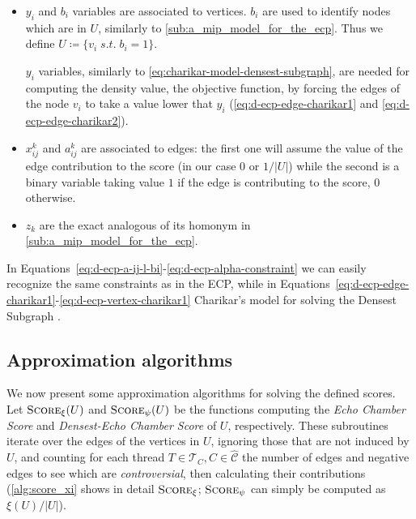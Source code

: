 \begin{itemize}
	\item $y_i$ and $b_i$ variables are associated to vertices. $b_i$ are used
	      to identify nodes which are in $U$, similarly to
	      \autoref{sub:a_mip_model_for_the_ecp}. Thus we define $U \coloneqq \{ v_i
		      \; s.t. \; b_i = 1\}$.

	      $y_i$ variables, similarly to
	      \autoref{eq:charikar-model-densest-subgraph}, are needed for
	      computing the density value, the objective function,
	      by forcing the edges of the node $v_{i} $ to take a value lower that
	      $y_i$ (\autoref{eq:d-ecp-edge-charikar1} and
	      \autoref{eq:d-ecp-edge-charikar2}).
	\item $x_{ij}^{k}  $ and $a_{ij}^{k}  $ are associated to edges: the
	      first one will assume the value of the edge contribution to the score (in
	      our case $0$ or $1/|U|$) while the second is a binary variable taking
	      value $1$ if the edge is contributing to the score, $0$ otherwise.
	\item $z_k$ are the exact analogous of its homonym in
	      \autoref{sub:a_mip_model_for_the_ecp}.
\end{itemize}

In Equations~\ref{eq:d-ecp-a-ij-l-bi}-\ref{eq:d-ecp-alpha-constraint}
we can easily recognize the same constraints as in the \acrshort{ECP}, while in
Equations~\ref{eq:d-ecp-edge-charikar1}-\ref{eq:d-ecp-vertex-charikar1}
Charikar's model for solving the Densest Subgraph \cite{charikar2000greedy}.

\subsection{Approximation algorithms}%
\label{sub:approximation_algorithms}

We now present some approximation algorithms for solving the defined scores.
Let $\textsc{Score}_{\xi} (U)$ and $\textsc{Score}_{\psi} (U)$ be the functions computing the
\emph{Echo Chamber Score} and \emph{Densest-Echo Chamber Score} of $U$,
respectively. These subroutines iterate over the edges of the vertices in $U$,
ignoring those that are not induced by $U$, and counting for each thread $T \in
	\mathcal{T}_{C}, C \in \mathcal{\hat{C}} $ the number of edges and negative edges
to see which are \emph{controversial}, then calculating their contributions
(\autoref{alg:score_xi} shows in detail $\textsc{Score}_\xi$;
$\textsc{Score}_\psi$ can simply be computed as $\xi(U)/|U|$).

